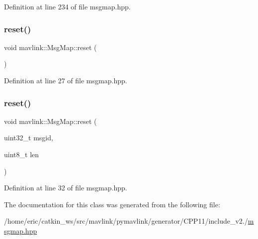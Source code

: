 Definition at line 234 of file msgmap.\+hpp.

\mbox{\label{classmavlink_1_1MsgMap_a2eae010a75187fdc08da24d9bb53a3ca}} 
\subsubsection{\texorpdfstring{reset()}{reset()}\hspace{0.1cm}{\footnotesize\ttfamily [1/2]}}
{\footnotesize\ttfamily void mavlink\+::\+Msg\+Map\+::reset (\begin{DoxyParamCaption}{ }\end{DoxyParamCaption})\hspace{0.3cm}{\ttfamily [inline]}}



Definition at line 27 of file msgmap.\+hpp.

\mbox{\label{classmavlink_1_1MsgMap_a10c2f9d9a43770eefa072b53d64a9291}} 
\subsubsection{\texorpdfstring{reset()}{reset()}\hspace{0.1cm}{\footnotesize\ttfamily [2/2]}}
{\footnotesize\ttfamily void mavlink\+::\+Msg\+Map\+::reset (\begin{DoxyParamCaption}\item[{uint32\+\_\+t}]{msgid,  }\item[{uint8\+\_\+t}]{len }\end{DoxyParamCaption})\hspace{0.3cm}{\ttfamily [inline]}}



Definition at line 32 of file msgmap.\+hpp.



The documentation for this class was generated from the following file\+:\begin{DoxyCompactItemize}
\item 
/home/eric/catkin\+\_\+ws/src/mavlink/pymavlink/generator/\+C\+P\+P11/include\+\_\+v2./\mbox{\hyperlink{msgmap_8hpp}{msgmap.\+hpp}}\end{DoxyCompactItemize}
